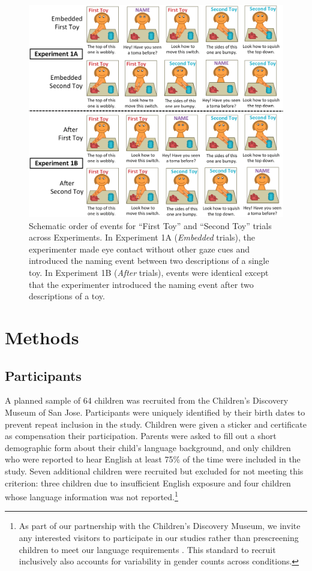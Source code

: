 \documentclass[man]{apa2}
\begin{document}
\begin{figure} 
  \begin{center} 
    \includegraphics[width=6in]{figures/continuity_demo_all_trials.png} 
    \caption{\label{fig:demo} Schematic order of events for ``First Toy'' and ``Second Toy'' trials across Experiments. In Experiment 1A (\emph{Embedded} trials), the experimenter made eye contact without other gaze cues and introduced the naming event between two descriptions of a single toy.  In Experiment 1B (\emph{After} trials), events were identical except that the experimenter introduced the naming event after two descriptions of a toy.} 
  \end{center} 
\end{figure}	

\section{Methods}


\subsection{Participants}

A planned sample of 64 children was recruited from the Children's Discovery Museum of San Jose.  Participants were uniquely identified by their birth dates to prevent repeat inclusion in the study.  Children were given a sticker and certificate as compensation their participation.  Parents were asked to fill out a short demographic form about their child's language background, and only children who were reported to hear English at least 75\% of the time were included in the study.  Seven additional children were recruited but excluded for not meeting this criterion: three children due to insufficient English exposure and four children whose language information was not reported.\footnote{As part of our partnership with the Children's Discovery Museum, we invite any interested visitors to participate in our studies rather than prescreening children to meet our language requirements \cite{callanan2012}. This standard to recruit inclusively also accounts for variability in gender counts across conditions.}
\end{document}
